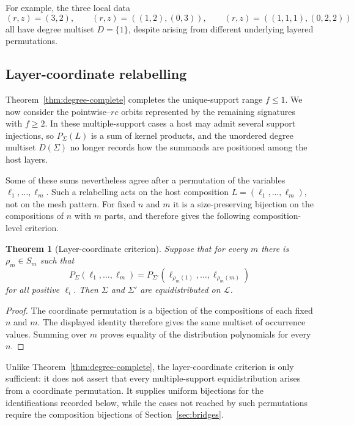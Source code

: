 \documentclass[12pt]{article}
\newtheorem{thm}{Theorem}[section]
\newcommand{\cL}{\mathcal L}
\begin{document}
For example, the three local data
\[
(r,z)=(3,2),\qquad
(r,z)=((1,2),(0,3)),\qquad
(r,z)=((1,1,1),(0,2,2))
\]
all have degree multiset $D=\{1\}$, despite arising from different
underlying layered permutations.

\subsection{Layer-coordinate relabelling}\label{sec:coordinate}

Theorem~\ref{thm:degree-complete} completes the unique-support range
$f\le1$.  We now consider the pointwise--$rc$ orbits represented by the
remaining signatures with $f\ge2$.  In these multiple-support cases a host may
admit several support injections, so $P_\Sigma(L)$ is a sum of kernel products,
and the unordered degree multiset $D(\Sigma)$ no longer records how the
summands are positioned among the host layers.

Some of these sums nevertheless agree after a permutation of the variables
$\ell_1,\ldots,\ell_m$.  Such a relabelling acts on the host composition
$L=(\ell_1,\ldots,\ell_m)$, not on the mesh pattern.  For fixed $n$ and $m$ it
is a size-preserving bijection on the compositions of $n$ with $m$ parts, and
therefore gives the following composition-level criterion.

\begin{thm}[Layer-coordinate criterion]\label{thm:coordinate}
Suppose that for every $m$ there is $\rho_m\in S_m$ such that
\[
P_\Sigma(\ell_1,\ldots,\ell_m)=
P_{\Sigma'}(\ell_{\rho_m(1)},\ldots,\ell_{\rho_m(m)})
\]
for all positive $\ell_i$.  Then $\Sigma$ and $\Sigma'$ are equidistributed
on $\cL$.
\end{thm}

\begin{proof}
The coordinate permutation is a bijection of the compositions of each fixed
$n$ and $m$.  The displayed identity therefore gives the same multiset of
occurrence values.  Summing over $m$ proves equality of the distribution
polynomials for every $n$.
\end{proof}

Unlike Theorem~\ref{thm:degree-complete}, the layer-coordinate criterion is
only sufficient: it does not assert that every multiple-support
equidistribution arises from a coordinate permutation.  It supplies uniform
bijections for the identifications recorded below, while the cases not reached
by such permutations require the composition bijections of
Section~\ref{sec:bridges}.
\end{document}
